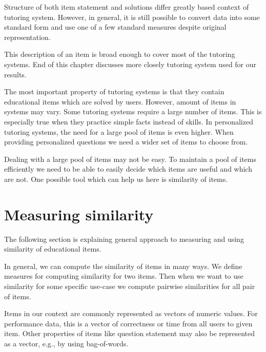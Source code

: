 \documentclass[
  digital, %
  table,   %
  nolof,     %
  nolot,     %
  nocover
]{fithesis3}
\begin{document}
Structure of both item statement and solutions differ greatly based context of tutoring system. However, in general, it is still possible to convert data into some standard form and use one of a few standard measures despite original representation.

This description of an item is broad enough to cover most of the tutoring systems. End of this chapter discusses more closely tutoring system used for our results.


The most important property of tutoring systems is that they contain educational items which are solved by users. However, amount of items in systems may vary. Some tutoring systems require a large number of items. This is especially true when they practice simple facts instead of skills. In personalized tutoring systems, the need for a large pool of items is even higher. When providing personalized questions we need a wider set of items to choose from.


Dealing with a large pool of items may not be easy. To maintain a pool of items efficiently we need to be able to easily decide which items are useful and which are not. One possible tool which can help us here is similarity of items.


\section{Measuring similarity}\label{measuring-similarity}

The following section is explaining general approach to measuring and using similarity of educational items.


In general, we can compute the similarity of items in many ways. We define measures for computing similarity for two items. Then when we want to use similarity for some specific use-case we compute pairwise similarities for all pair of items.

Items in our context are commonly represented as vectors of numeric values. For performance data, this is a vector of correctness or time from all users to given item. Other properties of items like question statement may also be represented as a vector, e.g., by using bag-of-words.
\end{document}
